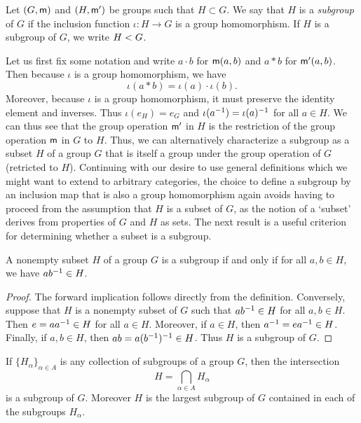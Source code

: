 \begin{definition}
    \label{def:subgroup}
    Let \((G, {\mathsf{m}})\) and \((H, {\mathsf{m}}')\) be groups such that \(H \subset G\).
    We say that \(H\) is a \emph{subgroup} of \(G\) if the inclusion function
    \(\iota : H \to G\) is a group homomorphism. If \(H\) is a subgroup of
    \(G\), we write \(H < G\).
\end{definition}

Let us first fix some notation and write \(a \cdot b\) for \({\mathsf{m}}(a,b)\) and
\(a * b\) for \({\mathsf{m}}'(a,b)\). Then because \(\iota\) is a group homomorphism,
we have
\[
    \iota(a * b) = \iota(a) \cdot \iota(b).
\]
Moreover, because \(\iota\) is a group homomorphism, it must preserve the
identity element and inverses. Thus \(\iota(e_H) = e_G\) and \(\iota(a^{-1}) =
\iota(a)^{-1}\) for all \(a \in H\). We can thus see that the group operation
\({\mathsf{m}}'\) in \(H\) is the restriction of the group operation \({\mathsf{m}}\) in \(G\)
to \(H\). Thus, we can alternatively characterize a subgroup as a subset \(H\)
of a group \(G\) that is itself a group under the group operation of \(G\)
(retricted to \(H\)). Continuing with our desire to use general definitions
which we might want to extend to arbitrary categories, the choice to define a
subgroup by an inclusion map that is also a group homomorphism again avoids
having to proceed from the assumption that \(H\) is a subset of \(G\), as the
notion of a `subset' derives from properties of \(G\) and \(H\) as sets. The
next result is a useful criterion for determining whether a subset is a
subgroup.

\begin{theorem}
    \label{thm:subgroup-test}
    A nonempty subset \(H\) of a group \(G\) is a subgroup if and only if for
    all \(a, b \in H\), we have \(ab^{-1} \in H\).
\end{theorem}

\begin{proof}
    The forward implication follows directly from the definition. Conversely,
    suppose that \(H\) is a nonempty subset of \(G\) such that \(ab^{-1} \in H\)
    for all \(a, b \in H\). Then \(e = aa^{-1} \in H\) for all \(a \in H\).
    Moreover, if \(a \in H\), then \(a^{-1} = ea^{-1} \in H\). Finally, if \(a, b
    \in H\), then \(ab = a(b^{-1})^{-1} \in H\). Thus \(H\) is a subgroup of
    \(G\).
\end{proof}

\begin{theorem}
    \label{thm:intersection-subgroups}
    If \(\{H_{\alpha}\}_{\alpha \in A}\) is any collection of subgroups of a
    group \(G\), then the intersection
    \[
        H = \bigcap_{\alpha \in A} H_{\alpha}
    \]
    is a subgroup of \(G\). Moreover \(H\) is the largest subgroup of \(G\)
    contained in each of the subgroups \(H_{\alpha}\).
\end{theorem}

